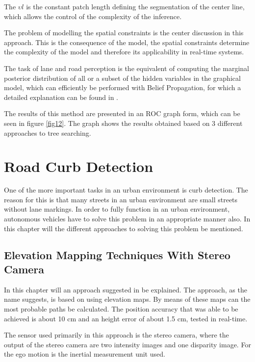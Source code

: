 The $\upsilon l $ is the constant patch length defining the segmentation of the center line, which allows the control of the complexity of the inference. 

The problem of modelling the spatial constraints is the center discussion in this approach. This is the consequence of the model, the spatial constraints determine the complexity of the model and therefore its applicability in real-time systems. 

The task of lane and road perception is the equivalent of computing the marginal posterior distribution of all or a subset of the hidden variables in the graphical model, which can efficiently be performed with Belief Propagation, for which a detailed explanation can be found in \cite{lanesystem}.

The results of this method are presented in an ROC graph form, which can be seen in figure \ref{fig12}. The graph shows the results obtained based on 3 different approaches to tree searching.

\chapter{Road Curb Detection}

One of the more important tasks in an urban environment is curb detection. The reason for this is that many streets in an urban environment are small streets without lane markings. In order to fully function in an urban environment, autonomous vehicles have to solve this problem in an appropriate manner also. In this chapter will the different approaches to solving this problem be mentioned.  

\section{Elevation Mapping Techniques With Stereo Camera}

In this chapter will an approach suggested in \cite{stereo} be explained. The approach, as the name suggests, is based on using elevation maps. By means of these maps can the most probable paths be calculated. The position accuracy that was able to be achieved is about 10 cm and an height error of about 1.5 cm, tested in real-time.

The sensor used primarily in this approach is the stereo camera, where the output of the stereo camera are two intensity images and one disparity image. For the ego motion is the inertial measurement unit used. 

